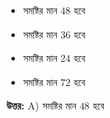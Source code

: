 \documentclass[12pt, a4paper]{article}
\begin{document}
\begin{itemize}[label={}, leftmargin=1cm, itemsep=0.5em]
    \item[\textbf{A)}] সমষ্টির মান $48$ হবে
    \item[\textbf{B)}] সমষ্টির মান $36$ হবে
    \item[\textbf{C)}] সমষ্টির মান $24$ হবে
    \item[\textbf{D)}] সমষ্টির মান $72$ হবে
\end{itemize}

\vspace{0.5em}
\begin{tcolorbox}[answerbox]
    \textbf{\color{success} উত্তর:} A) সমষ্টির মান $48$ হবে
\end{tcolorbox}
\vspace{1em}
\end{document}
